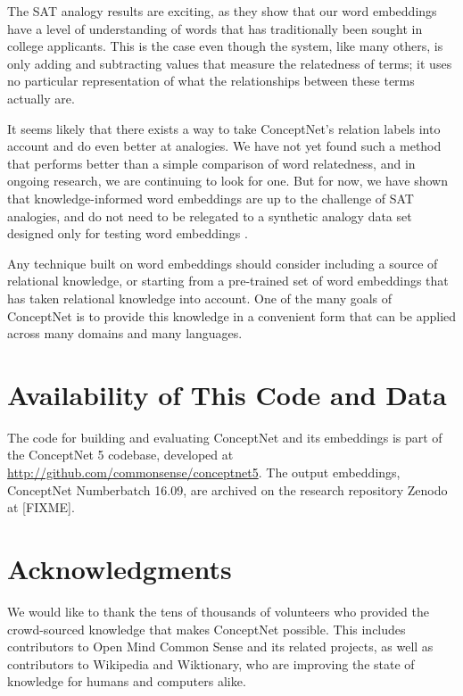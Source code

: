 \documentclass[letterpaper]{article}
\begin{document}
The SAT analogy results are exciting, as they show that our word embeddings
have a level of understanding of words that has traditionally been sought in
college applicants. This is the case even though the system, like many others,
is only adding and subtracting values that measure the relatedness of terms; it
uses no particular representation of what the relationships between these terms
actually are.

It seems likely that there exists a way to take ConceptNet's relation labels
into account and do even better at analogies. We have not yet found such a
method that performs better than a simple comparison of word relatedness, and
in ongoing research, we are continuing to look for one. But for now, we have
shown that knowledge-informed word embeddings are up to the challenge of SAT
analogies, and do not need to be relegated to a synthetic analogy data set
designed only for testing word embeddings \cite{mikolov2013word2vec}.

Any technique built on word embeddings should
consider including a source of relational knowledge, or starting from a
pre-trained set of word embeddings that has taken relational knowledge into
account. One of the many goals of ConceptNet is to provide this knowledge in a
convenient form that can be applied across many domains and many languages.


\section{Availability of This Code and Data}


The code for building and evaluating ConceptNet and its embeddings is part of
the ConceptNet 5 codebase, developed at \url{http://github.com/commonsense/conceptnet5}.
The output embeddings, ConceptNet Numberbatch 16.09, are archived on the research
repository Zenodo at [FIXME].

\section{Acknowledgments}

We would like to thank the tens of thousands of volunteers who provided the
crowd-sourced knowledge that makes ConceptNet possible. This includes
contributors to Open Mind Common Sense and its related projects, as well as
contributors to Wikipedia and Wiktionary, who are improving the state of
knowledge for humans and computers alike.



\end{document}
